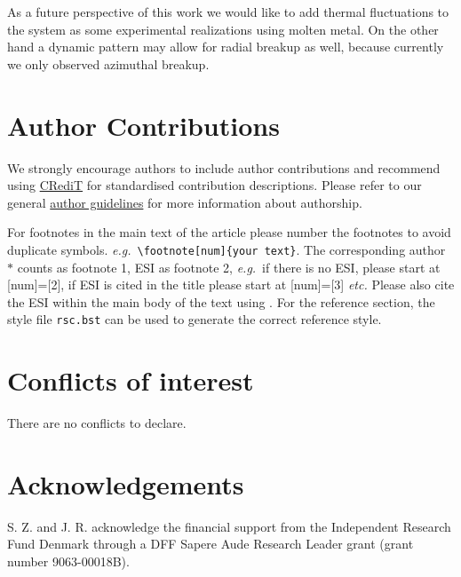 \documentclass[twoside,twocolumn,9pt]{article}
\renewcommand{\refname}{Notes and references}
\begin{document}
As a future perspective of this work we would like to add thermal fluctuations to the system as some experimental realizations using molten metal.
On the other hand a dynamic pattern may allow for radial breakup as well, because currently we only observed azimuthal breakup.

\section*{Author Contributions}
We strongly encourage authors to include author contributions and recommend using \href{https://casrai.org/credit/}{CRediT} for standardised contribution descriptions. Please refer to our general \href{https://www.rsc.org/journals-books-databases/journal-authors-reviewers/author-responsibilities/}{author guidelines} for more information about authorship.

For footnotes in the main text of the article please number the footnotes to avoid duplicate symbols. \textit{e.g.}\ \texttt{\textbackslash footnote[num]\{your text\}}. The corresponding author $\ast$ counts as footnote 1, ESI as footnote 2, \textit{e.g.}\ if there is no ESI, please start at [num]=[2], if ESI is cited in the title please start at [num]=[3] \textit{etc.} Please also cite the ESI within the main body of the text using \dag. For the reference section, the style file \texttt{rsc.bst} can be used to generate the correct reference style.

\section*{Conflicts of interest}
There are no conflicts to declare.

\section*{Acknowledgements}
S. Z. and J. R. acknowledge the financial support from the Independent Research Fund Denmark through a DFF Sapere Aude Research Leader grant (grant number 9063-00018B).





\balance

\end{document}
